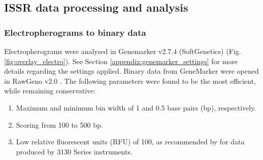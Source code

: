 \subsection{ISSR data processing and analysis}

\subsubsection{Electropherograms to binary data}
Electropherograms were analysed in Genemarker\textsuperscript{\textregistered} v2.7.4 (SoftGenetics\textsuperscript{\textregistered}) (Fig. \ref{fig:overlay_electro}). 
See Section \ref{appendix:genemarker_settings} for more details regarding the settings applied.
Binary data from GeneMarker\textsuperscript{\textregistered} were opened in RawGeno v2.0 \citep{arrigo2012automated}. The following parameters were found to be the most efficient, while remaining conservative: 
\vspace{0.4cm}
\begin{enumerate}
    \item Maximum and minimum bin width of 1 and 0.5 base pairs (bp), respectively.
    \item Scoring from 100 to 500 bp.
    \item Low relative fluorescent units (RFU) of 100, as recommended by \citet{DNAFragAnalysis} for data produced by 3130 Series instruments.
\end{enumerate}
\vspace{0.4cm}

